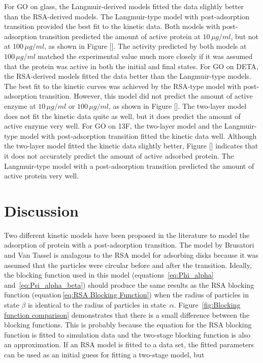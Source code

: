For GO on glass, the Langmuir-derived models fitted the data slightly
better than the RSA-derived models. The Langmuir-type model with post-adsorption
transition provided the best fit to the kinetic data. Both models
with post-adsorption transition predicted the amount of active protein
at $10\,\mu g/ml$, but not at $100\,\mu g/ml$, as shown in Figure
{[}{]}. The activity predicted by both models at $100\,\mu g/ml$
matched the experimental value much more closely if it was assumed
that the protein was active in both the initial and final states.
For GO on DETA, the RSA-derived models fitted the data better than
the Langmuir-type models. The best fit to the kinetic curves was achieved
by the RSA-type model with post-adsorption transition. However, this
model did not predict the amount of active enzyme at $10\,\mu g/ml$
or $100\,\mu g/ml$, as shown in Figure {[}{]}. The two-layer model
does not fit the kinetic data quite as well, but it does predict the
amount of active enzyme very well. For GO on 13F, the two-layer model
and the Langmuir-type model with post-adsorption transition fitted
the kinetic data well. Although the two-layer model fitted the kinetic
data slightly better, Figure {[}{]} indicates that it does not accurately
predict the amount of active adsorbed protein. The Langmuir-type model
with a post-adsorption transition predicted the amount of active protein
very well.


\section{Discussion}

Two different kinetic models have been proposed in the literature
to model the adsorption of protein with a post-adsorption transition.
The model by Brusatori and Van Tassel \cite{Brusatori1999} is analagous
to the RSA model for adsorbing disks because it was assumed that the
particles were circular before and after the transition. Ideally,
the blocking function used in this model (equations~\ref{eq:Phi_alpha}
and~\ref{eq:Psi_alpha_beta}) should produce the same results as
the RSA blocking function (equation\,\ref{eq:RSA Blocking Function})
when the radius of particles in state $\beta$ is identical to the
radius of particles in state~$\alpha$. Figure~\ref{fig:Blocking function comparison}
demonstrates that there is a small difference between the blocking
functions. This is probably because the equation for the RSA blocking
function is fitted to simulation data and the two-stage blocking function
is also an approximation. If an RSA model is fitted to a data set,
the fitted parameters can be used as an initial guess for fitting
a two-stage model, but 

